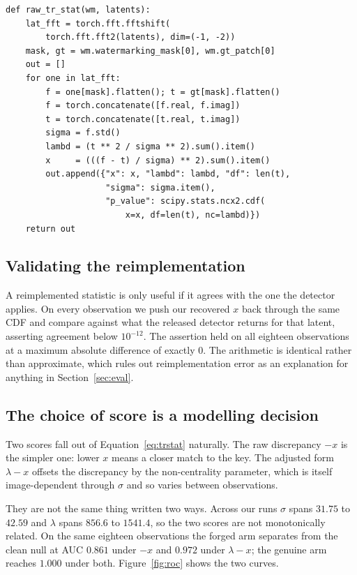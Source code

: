 \documentclass[10pt,twocolumn]{article}
\newcommand{\xstat}{\ensuremath{x}}
\newcommand{\lam}{\ensuremath{\lambda}}
\begin{document}
\begin{lstlisting}[caption={Recovering the discarded statistic. The arithmetic mirrors
the released detector; the intermediates are kept rather than collapsed into a
CDF.},label=lst:rawstat]
def raw_tr_stat(wm, latents):
    lat_fft = torch.fft.fftshift(
        torch.fft.fft2(latents), dim=(-1, -2))
    mask, gt = wm.watermarking_mask[0], wm.gt_patch[0]
    out = []
    for one in lat_fft:
        f = one[mask].flatten(); t = gt[mask].flatten()
        f = torch.concatenate([f.real, f.imag])
        t = torch.concatenate([t.real, t.imag])
        sigma = f.std()
        lambd = (t ** 2 / sigma ** 2).sum().item()
        x     = (((f - t) / sigma) ** 2).sum().item()
        out.append({"x": x, "lambd": lambd, "df": len(t),
                    "sigma": sigma.item(),
                    "p_value": scipy.stats.ncx2.cdf(
                        x=x, df=len(t), nc=lambd)})
    return out
\end{lstlisting}

\subsection{Validating the reimplementation}

A reimplemented statistic is only useful if it agrees with the one the detector
applies. On every observation we push our recovered $\xstat$ back through the same CDF
and compare against what the released detector returns for that latent, asserting
agreement below $10^{-12}$. The assertion held on all eighteen observations at a
maximum absolute difference of exactly $0$. The arithmetic is identical rather than
approximate, which rules out reimplementation error as an explanation for anything in
Section~\ref{sec:eval}.

\subsection{The choice of score is a modelling decision}
\label{sec:score}

Two scores fall out of Equation~\ref{eq:trstat} naturally. The raw discrepancy
$-\xstat$ is the simpler one: lower $\xstat$ means a closer match to the key. The
adjusted form $\lam - \xstat$ offsets the discrepancy by the non-centrality parameter,
which is itself image-dependent through $\sigma$ and so varies between observations.

They are not the same thing written two ways. Across our runs $\sigma$ spans $31.75$
to $42.59$ and $\lam$ spans $856.6$ to $1541.4$, so the two scores are not
monotonically related. On the same eighteen observations the forged arm separates from
the clean null at AUC $0.861$ under $-\xstat$ and $0.972$ under $\lam - \xstat$; the
genuine arm reaches $1.000$ under both. Figure~\ref{fig:roc} shows the two curves.
\end{document}
